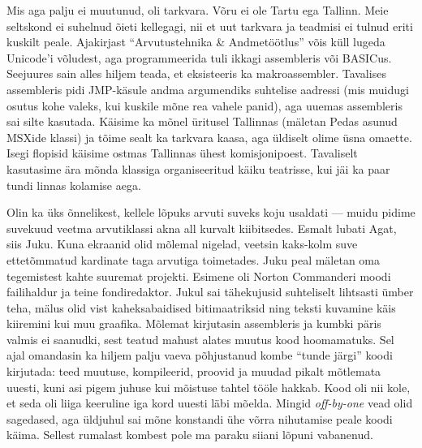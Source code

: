 Mis aga palju ei muutunud, oli tarkvara. Võru ei ole Tartu ega 
Tallinn. Meie seltskond ei suhelnud õieti kellegagi, nii et uut tarkvara ja
teadmisi ei tulnud eriti kuskilt peale. Ajakirjast \enquote{Arvutustehnika \& 
Andmetöötlus} 
võis küll lugeda Unicode'i võludest, aga programmeerida tuli ikkagi 
assembleris või BASICus. Seejuures sain alles hiljem teada, et eksisteeris 
ka makroassembler. Tavalises assembleris pidi JMP-käsule andma argumendiks 
suhtelise aadressi (mis muidugi osutus kohe valeks, kui kuskile mõne rea 
vahele panid), aga 
uuemas assembleris sai silte kasutada. Käisime ka mõnel üritusel Tallinnas (mäletan 
Pedas asunud MSXide klassi) 
ja tõime sealt ka tarkvara kaasa, aga üldiselt olime üsna omaette. Isegi 
flopisid käisime ostmas Tallinnas ühest komisjonipoest. Tavaliselt kasutasime ära mõnda klassiga organiseeritud käiku teatrisse, kui jäi 
ka paar tundi linnas kolamise aega. 

Olin ka üks õnnelikest, kellele lõpuks arvuti suveks koju usaldati --- muidu pidime 
suvekuud veetma arvutiklassi akna all kurvalt kiibitsedes. Esmalt lubati
Agat, siis Juku. Kuna ekraanid olid mõlemal nigelad, veetsin kaks-kolm suve 
ettetõmmatud kardinate taga arvutiga toimetades. Juku peal mäletan oma tegemistest kahte 
suuremat projekti. Esimene oli Norton Commanderi moodi failihaldur ja teine 
fondiredaktor. Jukul sai tähekujusid suhteliselt lihtsasti ümber teha, mälus 
olid vist kaheksabaidised bitimaatriksid ning teksti kuvamine käis kiiremini 
kui muu graafika. Mõlemat kirjutasin assembleris ja kumbki päris valmis ei 
saanudki, sest teatud mahust alates muutus kood hoomamatuks. Sel ajal omandasin 
ka hiljem palju vaeva põhjustanud kombe \enquote{tunde järgi} koodi kirjutada: 
teed muutuse, kompileerid, proovid ja muudad pikalt mõtlemata uuesti, kuni 
asi pigem juhuse kui mõistuse tahtel tööle hakkab. Kood oli
nii kole, et seda oli liiga keeruline iga kord uuesti läbi mõelda. Mingid 
\emph{off-by-one} vead olid sagedased, aga üldjuhul sai mõne konstandi ühe võrra 
nihutamise peale koodi käima. Sellest rumalast kombest pole ma paraku siiani lõpuni 
vabanenud. 

